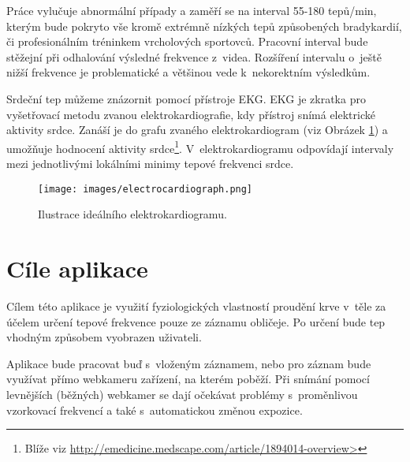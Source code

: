 \documentclass[
  digital, %
  table,   %
%
  lof,     %
  lot,     %
]{fithesis3}
\begin{document}
Práce vylučuje abnormální případy a zaměří se na interval 55-180 tepů/min, kterým bude pokryto vše kromě extrémně nízkých tepů způsobených bradykardií, či profesionálním tréninkem vrcholových sportovců. Pracovní interval bude stěžejní při odhalování výsledné frekvence z~videa. Rozšíření intervalu o~ještě nižší frekvence je problematické a většinou vede k~nekorektním výsledkům.

Srdeční tep můžeme znázornit pomocí přístroje EKG. EKG je zkratka pro vyšetřovací metodu zvanou elektrokardiografie, kdy přístroj snímá elektrické aktivity srdce. Zanáší je do grafu zvaného elektrokardiogram (viz Obrázek \ref{fig:electrocardiograph}) a umožňuje hodnocení aktivity srdce\footnote{Blíže viz \url{http://emedicine.medscape.com/article/1894014-overview>}}. V~elektrokardiogramu odpovídají intervaly mezi jednotlivými lokálními minimy tepové frekvenci srdce.

\begin{figure}
  \begin{center}
    \texttt{[image: images/electrocardiograph.png]}
  \end{center}
  \caption{Ilustrace ideálního elektrokardiogramu.}
  \label{fig:electrocardiograph}
\end{figure}

\section{Cíle aplikace}
Cílem této aplikace je využití fyziologických vlastností proudění krve v~těle za účelem určení tepové frekvence pouze ze záznamu obličeje. Po určení bude tep vhodným způsobem vyobrazen uživateli.

Aplikace bude pracovat buď s~vloženým záznamem, nebo pro záznam bude využívat přímo webkameru zařízení, na kterém poběží. Při snímání pomocí levnějších (běžných) webkamer se dají očekávat problémy s~proměnlivou vzorkovací frekvencí a také s~automatickou změnou expozice.
\end{document}
